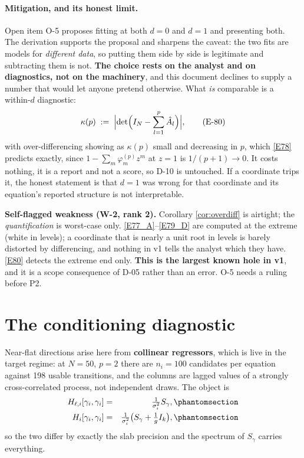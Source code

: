 \paragraph{Mitigation, and its honest limit.} Open item O-5 proposes fitting at both
$d=0$ and $d=1$ and presenting both. The derivation supports the proposal and
sharpens the caveat: the two fits are models for \emph{different data}, so putting
them side by side is legitimate and subtracting them is not. \textbf{The choice rests
on the analyst and on diagnostics, not on the machinery}, and this document declines
to supply a number that would let anyone pretend otherwise. What \emph{is} comparable
is a within-$d$ diagnostic:
\begin{equation}
\kappa(p) \;:=\; \Bigl|\det\Bigl(I_N-\sum_{l=1}^{p}\hat A_l\Bigr)\Bigr|,
\tag{E-80}\label{E80}
\end{equation}
with over-differencing showing as $\kappa(p)$ small and decreasing in $p$, which
\eqref{E78} predicts exactly, since $1-\sum_m\varphi_m^{(p)}z^m$ at $z=1$ is
$1/(p+1)\to0$. It costs nothing, it is a report and not a score, so D-10 is
untouched. If a coordinate trips it, the honest statement is that $d=1$ was wrong for
that coordinate and its equation's reported structure is not interpretable.

\begin{recordbox}
\textbf{Self-flagged weakness (W-2, rank 2).} Corollary \ref{cor:overdiff} is
airtight; the \emph{quantification} is worst-case only. \eqref{E77_A}--\eqref{E79_D} are
computed at the extreme (white in levels); a coordinate that is nearly a unit root in
levels is barely distorted by differencing, and nothing in v1 tells the analyst which
they have. \eqref{E80} detects the extreme end only. \textbf{This is the largest
known hole in v1}, and it is a scope consequence of D-05 rather than an error. O-5
needs a ruling before P2.
\end{recordbox}


\section{The conditioning diagnostic}\label{sec:cond}

Near-flat directions arise here from \textbf{collinear regressors}, which is live in
the target regime: at $N=50$, $p=2$ there are $n_i=100$ candidates per equation
against 198 usable transitions, and the columns are lagged values of a strongly
cross-correlated process, not independent draws. The object is
\begin{eqnarray}
H_{\ell,i}[\gamma_i,\gamma_i] &=& \tfrac{1}{\sigma_i^2}S_\gamma,
  \Elabel{E-82A}{E82_A} \\
H_i[\gamma_i,\gamma_i] &=& \tfrac{1}{\sigma_i^2}\bigl(S_\gamma+\tfrac1gI_k\bigr),
  \Elabel{E-82B}{E82_B}
\end{eqnarray}
so the two differ by exactly the slab precision and the spectrum of $S_\gamma$
carries everything.

